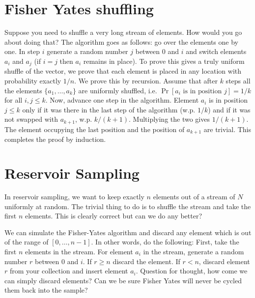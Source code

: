 \documentclass{article}
\begin{document}
\section{Fisher Yates shuffling}
Suppose you need to shuffle a very long stream of elements. How would you go about doing that?
The algorithm goes as follows: go over the elements one by one.
In step $i$ generate a random number $j$ between $0$ and $i$ and switch
elements $a_i$ and $a_j$ (if $i=j$ then $a_i$ remains in place).
To prove this gives a truly uniform shuffle of the vector, we prove that each element 
is placed in any location with probability exactly $1/n$.
We prove this by recursion. Assume that after $k$ steps all the elements $\{a_1,\ldots,a_k\}$ 
are uniformly shuffled, i.e. $\Pr[a_i \mbox{ is in position } j] = 1/k$ for all $i,j \le k$. 
Now, advance one step in the algorithm.
Element $a_i$ is in position $j \le k$ only if it was there in the last step of the algorithm (w.p. $1/k$) and if
it was not swapped with $a_{k+1}$, w.p. $k/(k+1)$. Multiplying the two gives $1/(k+1)$.
The element occupying the last position and the position of $a_{k+1}$ are trivial. 
This completes the proof by induction.

\section{Reservoir Sampling}
In reservoir sampling, we want to keep exactly $n$ elements out of a stream of $N$ uniformly at random.
The trivial thing to do is to shuffle the stream and take the first $n$ elements. 
This is clearly correct but can we do any better?

We can simulate the Fisher-Yates algorithm and discard any element which is out
of the range of $[0,\ldots,n-1]$. In other words, do the following:
First, take the first $n$ elements in the stream.
For element $a_i$ in the stream, generate a random number $r$ between $0$ and $i$.
If $r \ge n$ discard the element. If $r<n$, discard element $r$ from your collection and insert element $a_i$.
Question for thought, how come we can simply discard elements? Can we be sure Fisher Yates will never be cycled them back into the sample?
\end{document}
